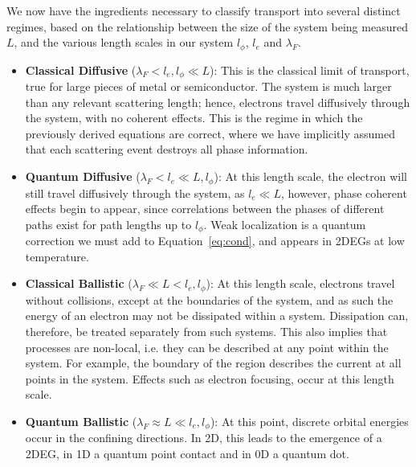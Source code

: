 We now have the ingredients necessary to classify transport into several distinct regimes, based on the relationship between the size
of the system being measured $L$, and the various length scales in our system $l_\phi$, $l_e$ and $\lambda_F$.
\begin{itemize}
  \item \textbf{Classical Diffusive} ($\lambda_F < l_e, l_\phi \ll L$): This is the classical limit of transport, true for large pieces of metal or semiconductor. The system is much larger than any relevant scattering length; hence, electrons travel diffusively through the system, with no coherent effects. This is the regime in which the previously derived equations are correct, where we have implicitly assumed that each scattering event destroys all phase information.
  \item \textbf{Quantum Diffusive} ($\lambda_F < l_e \ll L, l_\phi$): At this length scale, the electron will still travel diffusively through the system, as $l_e \ll L$, however, phase coherent effects begin to appear, since correlations between the phases of different paths exist for path lengths up to $l_\phi$. Weak localization is a quantum correction we must add to Equation~\ref{eq:cond}, and appears in 2DEGs at low temperature.
  \item \textbf{Classical Ballistic} ($\lambda_F \ll L < l_e, l_\phi$): At this length scale, electrons travel without collisions, except at the boundaries of the system, and as such the energy of an electron may not be dissipated within a system. Dissipation can, therefore, be treated separately from such systems. This also implies that processes are non-local, i.e. they can be described at any point within the system. For example, the boundary of the region describes the current at all points in the system. Effects such as electron focusing, occur at this length scale.
  \item \textbf{Quantum Ballistic} ($\lambda_F \approx L \ll l_e, l_\phi$): At this point, discrete orbital energies occur in the confining directions. In 2D, this leads to the emergence of a 2DEG, in 1D a quantum point contact and in 0D a quantum dot.
\end{itemize}

